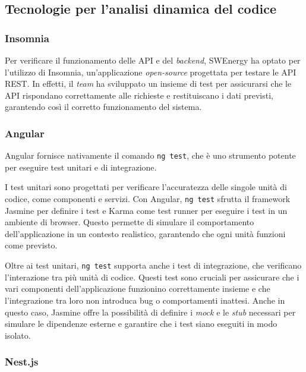 \subsection{Tecnologie per l'analisi dinamica del codice}

\subsubsection{Insomnia}

Per verificare il funzionamento delle API e del \textit{backend}, SWEnergy ha
optato per l'utilizzo di Insomnia, un'applicazione \textit{open-source} progettata per
testare le API REST. In effetti, il \textit{team} ha sviluppato un insieme di test per
assicurarsi che le API rispondano correttamente alle richieste e restituiscano i
dati previsti, garantendo così il corretto funzionamento del sistema.


\subsubsection{Angular}

Angular fornisce nativamente il comando \texttt{ng test}, che è uno strumento 
potente per eseguire test unitari e di integrazione.

I test unitari sono progettati per verificare l'accuratezza delle singole 
unità di codice, come componenti e servizi. Con Angular, \texttt{ng test} 
sfrutta il framework Jasmine per definire i test e Karma come test runner per 
eseguire i test in un ambiente di browser. Questo permette di simulare il 
comportamento dell'applicazione in un contesto realistico, garantendo che ogni 
unità funzioni come previsto.

Oltre ai test unitari, \texttt{ng test} supporta anche i test di integrazione, 
che verificano l'interazione tra più unità di codice. Questi test sono cruciali 
per assicurare che i vari componenti dell'applicazione funzionino 
correttamente insieme e che l'integrazione tra loro non introduca bug o 
comportamenti inattesi. Anche in questo caso, Jasmine offre la possibilità di
definire i \textit{mock} e le \textit{stub} necessari per simulare le dipendenze
esterne e garantire che i test siano eseguiti in modo isolato.

\subsubsection{Nest.js}

